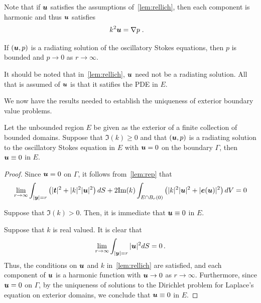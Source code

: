 \begin{remark} \label{rmk:harmu}
  Note that if ${\boldsymbol u}$ satisfies the assumptions
  of~\cref{lem:rellich}, then each component is harmonic
  and thus ${\boldsymbol u}$ satisfies
\begin{align}
k^2 {\boldsymbol u} &= \nabla p \label{eq:massconsred} \; .
\end{align}
\end{remark}

\begin{cor}
  If $({\boldsymbol u},p)$ is a radiating solution of
  the oscillatory Stokes equations, then
  $p$ is bounded and $p\to 0$ as $r\to\infty$.
\end{cor}

\begin{remark}
  It should be noted that in~\cref{lem:rellich}, ${\boldsymbol u}$ need
  not be a radiating solution. All that is assumed of ${\boldsymbol u}$
  is that it satifies the PDE in $E$.
\end{remark}

We now have the results needed to establish the
uniqueness of exterior boundary value problems.

\begin{thrm}
  Let the unbounded region $E$ be given as the exterior
  of a finite collection of bounded domains.
  Suppose that $\Im(k)\geq 0$ and 
  that $({\boldsymbol u},p)$ is a radiating solution to the oscillatory Stokes
  equation in $E$ with ${\boldsymbol u} =0$ on the boundary $\Gamma$, then
  ${\boldsymbol u} \equiv 0$ in $E$.
\end{thrm}

\begin{proof}
Since ${\boldsymbol u} = 0$ on $\Gamma$, it follows from~\cref{lem:rep} that
\begin{equation}
\lim_{r\to\infty}
\int_{|{\boldsymbol y}|=r} \left( |{\boldsymbol t}|^2 + |k|^2 |{\boldsymbol u}|^2 \right) dS +
2 {\textrm{\textup{Im}}}(k) \int_{E \cap B_{r}(0)} \left(|k|^2 |{\boldsymbol u}|^2 + |{\boldsymbol e}({\boldsymbol u})|^2 \right)
dV = 0 \nonumber
\end{equation}

Suppose that $\Im(k) > 0$. Then, it is immediate that
${\boldsymbol u} \equiv 0$ in $E$.

Suppose that $k$ is real valued. It is clear that
\begin{equation}
\lim_{r\to\infty} \int_{|{\boldsymbol y}|=r} |{\boldsymbol u}|^2 dS = 0 \, . \nonumber
\end{equation}
Thus, the conditions on ${\boldsymbol u}$ and $k$ in~\cref{lem:rellich}
are satisfied, and each component of ${\boldsymbol u}$ is a harmonic function
with ${\boldsymbol u} \to 0$ as $r \to \infty$. Furthermore, since ${\boldsymbol u}=0$ on
$\Gamma$, by the uniqueness of solutions to the
Dirichlet problem for Laplace's equation
on exterior domains, we conclude that ${\boldsymbol u} \equiv 0$
in $E$.
\end{proof}

